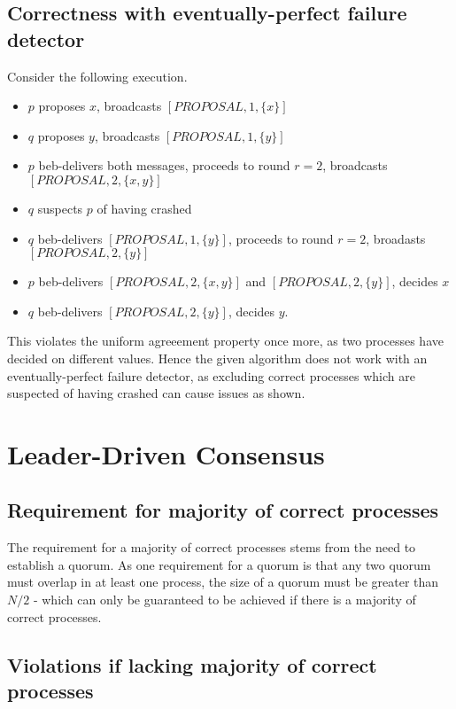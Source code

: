 \documentclass[a4paper]{scrreprt}
\begin{document}
\subsection{Correctness with eventually-perfect failure detector}

Consider the following execution.

\begin{itemize}
	\item $p$ proposes $x$, broadcasts $[PROPOSAL, 1, \{x\}]$
	\item $q$ proposes $y$, broadcasts $[PROPOSAL, 1, \{y\}]$
	\item $p$ beb-delivers both messages, proceeds to round $r = 2$, broadcasts $[PROPOSAL, 2, \{x, y\}]$
	\item $q$ suspects $p$ of having crashed
	\item $q$ beb-delivers $[PROPOSAL, 1, \{y\}]$, proceeds to round $r = 2$, broadasts $[PROPOSAL, 2, \{y\}]$
	\item $p$ beb-delivers $[PROPOSAL, 2, \{x, y\}]$ and $[PROPOSAL, 2, \{y\}]$, decides $x$
	\item $q$ beb-delivers $[PROPOSAL, 2, \{y\}]$, decides $y$.
\end{itemize}

This violates the uniform agreeement property once more, as two processes have
decided on different values. Hence the given algorithm does not work with an
eventually-perfect failure detector, as excluding correct processes which are
suspected of having crashed can cause issues as shown.

\section{Leader-Driven Consensus}

\subsection{Requirement for majority of correct processes}

The requirement for a majority of correct processes stems from the need to
establish a quorum. As one requirement for a quorum is that any two quorum must
overlap in at least one process, the size of a quorum must be greater than $N /
2$ - which can only be guaranteed to be achieved if there is a majority of
correct processes.

\subsection{Violations if lacking majority of correct processes}
\end{document}
